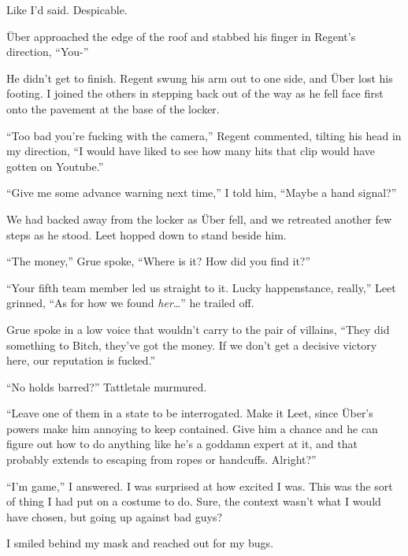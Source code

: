 Like I'd said.  Despicable.



\"{U}ber approached the edge of the roof and stabbed his finger in Regent's direction, ``You-''



He didn't get to finish.  Regent swung his arm out to one side, and \"{U}ber lost his footing.  I joined the others in stepping back out of the way as he fell face first onto the pavement at the base of the locker.



``Too bad you're fucking with the camera,'' Regent commented, tilting his head in my direction, ``I would have liked to see how many hits that clip would have gotten on Youtube.''



``Give me some advance warning next time,'' I told him, ``Maybe a hand signal?''



We had backed away from the locker as \"{U}ber fell, and we retreated another few steps as he stood.  Leet hopped down to stand beside him.



``The money,'' Grue spoke, ``Where is it?  How did you find it?''



``Your fifth team member led us straight to it.  Lucky happenstance, really,'' Leet grinned, ``As for how we found \emph{her}\ldots'' he trailed off.



Grue spoke in a low voice that wouldn't carry to the pair of villains, ``They did something to Bitch, they've got the money.  If we don't get a decisive victory here, our reputation is fucked.''



``No holds barred?'' Tattletale murmured.



``Leave one of them in a state to be interrogated.  Make it Leet, since \"{U}ber's powers make him annoying to keep contained.  Give him a chance and he can figure out how to do anything like he's a goddamn expert at it, and that probably extends to escaping from ropes or handcuffs.  Alright?''



``I'm game,'' I answered.  I was surprised at how excited I was.  This was the sort of thing I had put on a costume to do.  Sure, the context wasn't what I would have chosen, but going up against bad guys?



I smiled behind my mask and reached out for my bugs.





